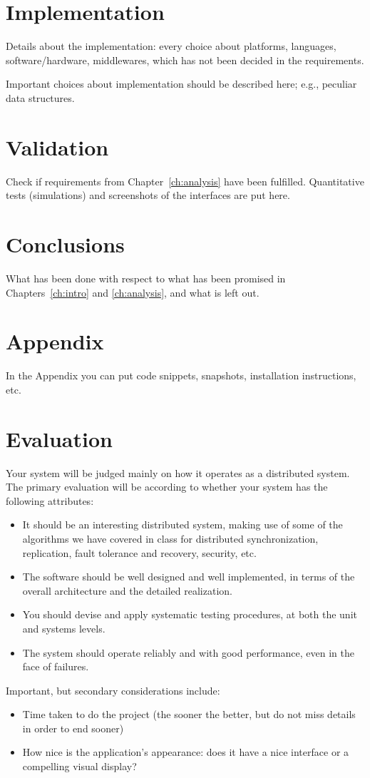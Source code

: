 \documentclass{memoir}
\begin{document}
\chapter{Implementation}

Details about the implementation: every choice about platforms, languages, software/hardware, middlewares, which has not been decided in the requirements.


Important choices about implementation should be described here; e.g., peculiar data structures.


\chapter{Validation}

Check if requirements from Chapter~\ref{ch:analysis} have been fulfilled.
Quantitative tests (simulations) and screenshots of the interfaces are put here.


\chapter{Conclusions}

What has been done with respect to what has been promised in Chapters~\ref{ch:intro} and \ref{ch:analysis}, and what is left out.

\appendix

\chapter{Appendix}

In the Appendix you can put code snippets, snapshots, installation instructions, etc.


\chapter*{Evaluation}
Your system will be judged mainly on how it operates as a distributed system. The primary evaluation will be according to whether your system has the following attributes:
\begin{itemize}
\item  It should be an interesting distributed system, making use of some of the algorithms we have covered in class for distributed synchronization, replication, fault tolerance and recovery, security, etc.
\item The software should be well designed and well implemented, in terms of the overall architecture and the detailed realization.
\item You should devise and apply systematic testing procedures, at both the unit and systems levels.
\item The system should operate reliably and with good performance, even in the face of failures.
\end{itemize}
Important, but secondary considerations include:
\begin{itemize}
\item Time taken to do the project (the sooner the better, but do not miss details in order to end sooner)
\item  How nice is the application's appearance: does it have a nice interface or a compelling visual display?
\end{itemize}
\end{document}
